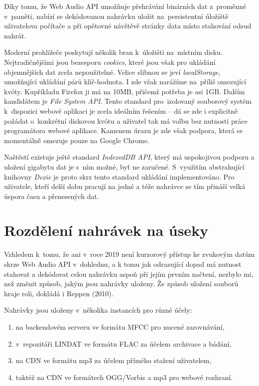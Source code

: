 Díky tomu, že Web Audio API umožňuje přehrávání binárních dat z~proměnné
v~paměti, nabízí se dekódovanou nahrávku uložit na~persistentní úložiště
uživatelova počítače a při opětovné návštěvě stránky data místo stahování odsud
nahrát.

Moderní prohlížeče poskytují několik bran k~úložišti na~místním disku.
Nejtradičnějšími jsou bezesporu \textit{cookies}, které jsou však pro ukládání
objemnějších dat zcela nepoužitelné. Velice slibnou se jeví
\textit{localStorage}, umožňující ukládání párů klíč-hodnota. I zde však
narážíme na~příliš omezující kvóty. Kupříkladu Firefox ji má na 10MB, přičemž
potřeba je asi 1GB. Dalším kandidátem je \textit{File System API}. Tento
standard pro~izolovaný souborový systém k~dispozici webové aplikaci je zcela
ideálním řešením -- dá se zde i explicitně požádat o~konkrétní diskovou kvótu a
uživatel tak má volbu bez nutnosti práce programátora webové aplikace. Kamenem
úrazu je zde však podpora, která se momentálně omezuje pouze na Google Chrome.

Naštěstí existuje ještě standard \textit{IndexedDB API}, který má uspokojivou
podporu a uložení gigabytu dat je s~ním možné, byť ne zaručené. S~využitím
abstrahující knihovny \textit{Dexie} je proto skrz tento standard ukládání
implementováno. Pro uživatele, kteří delší dobu pracují na jedné a téže nahrávce
se tím přináší velká úspora času a přenesených dat.

\section{Rozdělení nahrávek na úseky}

Vzhledem k~tomu, že ani v~roce 2019 není kurzorový přístup ke zvukovým datům
skrze Web Audio API v~dohlednu, a k tomu jak odrazující dopad má nutnost
stahovat a dekódovat celou nahrávku aspoň při jejím prvním načtení, nezbylo mi,
než změnit způsob, jakým jsou nahrávky uloženy. Že způsob uložení souborů hraje
roli, dokládá i Reppen (2010)\cite{reppen2010building}.

Nahrávky jsou uloženy v~několika instancích pro různé účely:

\begin{enumerate}
\item{na backendovém serveru ve formátu MFCC pro nucené zarovnávání,}
\item{v~repozitáři LINDAT ve formátu FLAC za účelem archivace a bádání,}
\item{na CDN ve formátu mp3 za účelem přímého stažení uživatelem,}
\item{taktéž na CDN ve formátech OGG/Vorbis a mp3 pro webové rozhraní.}
\end{enumerate}

